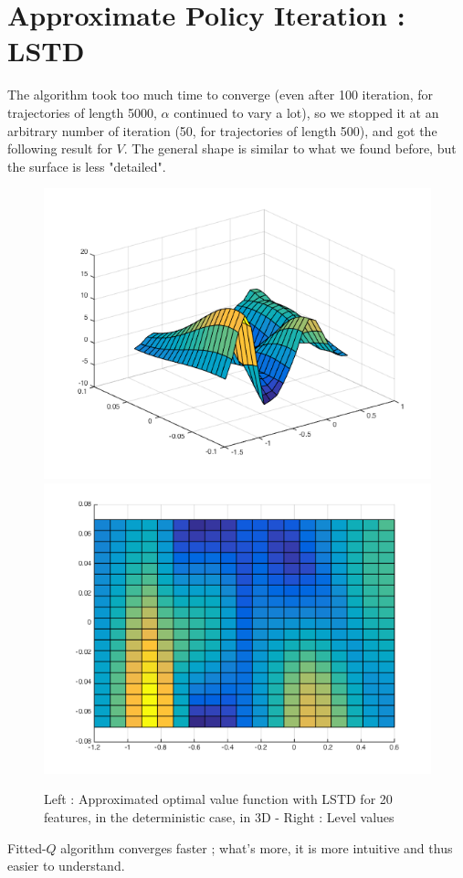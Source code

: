 \documentclass[a4paper, 12pt]{article}
\begin{document}
\section{Approximate Policy Iteration : LSTD}

The algorithm took too much time to converge (even after 100 iteration, for trajectories of length 5000, $\alpha$ continued to vary a lot), so we stopped it at an arbitrary number of iteration (50, for trajectories of length 500), and got the following result for $V$. The general shape is similar to what we found before, but the surface is less "detailed".
\begin{figure}[H]
	\centering
	\noindent\includegraphics[scale=0.3]{LSTD-50it.png}
	\noindent\includegraphics[scale=0.3]{LSTD-50it-flat.png}
	\caption{Left : Approximated optimal value function with LSTD for 20 features, in the deterministic case, in 3D - Right : Level values}
\end{figure}

Fitted-$Q$ algorithm converges faster ; what's more, it is more intuitive and thus easier to understand.
\end{document}
